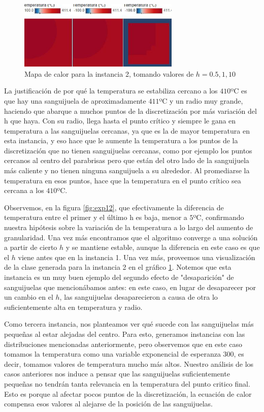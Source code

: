 \begin{figure}[h]
    \centering
    \includegraphics[width=0.685\textwidth]{Ejemplo Instancia 2}
    \caption{Mapa de calor para la instancia 2, tomando valores de $h = 0.5, 1, 10$}
    \label{fig:exp12-vis}
\end{figure}

La justificación de por qué la temperatura se estabiliza cercano a los $410$ºC es que hay una sanguijuela de aproximadamente $411$ºC y un radio muy grande, haciendo que abarque a muchos puntos de la discretización por más variación del h que haya. Con su radio, llega hasta el punto crítico y siempre le gana en temperatura a las sanguijuelas cercanas, ya que es la de mayor temperatura en esta instancia, y eso hace que le aumente la temperatura a los puntos de la discretización que no tienen sanguijuelas cercanas, como por ejemplo los puntos cercanos al centro del parabrisas pero que están del otro lado de la sanguijuela más caliente y no tienen ninguna sanguijuela a su alrededor. Al promediarse la temperatura en esos puntos, hace que la temperatura en el punto crítico sea cercana a los $410$ºC.

Observemos, en la figura \ref{fig:exp12}, que efectivamente la diferencia de temperatura entre el primer y el último h es baja, menor a $5$ºC, confirmando nuestra hipótesis sobre la variación de la temperatura a lo largo del aumento de granularidad. Una vez más encontramos que el algoritmo converge a una solución a partir de cierto $h$ y se mantiene estable, aunque la diferencia en este caso es que el $h$ viene antes que en la instancia 1. Una vez más, proveemos una visualización de la clase generada para la instancia 2 en el gráfico \ref{fig:exp12-vis}. Notemos que esta instancia es un muy buen ejemplo del segundo efecto de "desaparición" de sanguijuelas que mencionábamos antes: en este caso, en lugar de desaparecer por un cambio en el $h$, las sanguijuelas desaparecieron a causa de otra lo suficientemente alta en temperatura y radio.

Como tercera instancia, nos planteamos ver qué sucede con las sanguijuelas más pequeñas al estar alejadas del centro. Para esto, generamos instancias con las distribuciones mencionadas anteriormente, pero observemos que en este caso tomamos la temperatura como una variable exponencial de esperanza $300$, es decir, tomamos valores de temperatura mucho más altos. Nuestro análisis de los casos anteriores nos induce a pensar que las sanguijuelas suficientemente pequeñas no tendrán tanta relevancia en la temperatura del punto critico final. Esto es porque al afectar pocos puntos de la discretización, la ecuación de calor compensa esos valores al alejarse de la posición de las sanguijuelas. 

